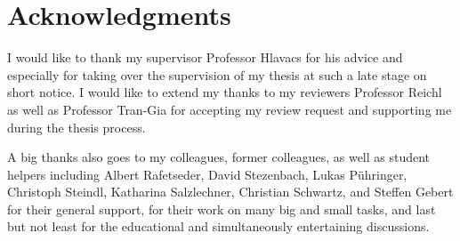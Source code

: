 \newpage %
\chapter*{Acknowledgments}

I would like to thank my supervisor Professor Hlavacs for his advice and especially for taking over the supervision of my thesis at such a late stage on short notice. I would like to extend my thanks to my reviewers Professor Reichl as well as Professor Tran-Gia for accepting my review request and supporting me during the thesis process.

A big thanks also goes to my colleagues, former colleagues, as well as student helpers including Albert Rafetseder, David Stezenbach, Lukas Pühringer, Christoph Steindl, Katharina Salzlechner, Christian Schwartz, and Steffen Gebert for their general support, for their work on many big and small tasks, and last but not least for the educational and simultaneously entertaining discussions. 
